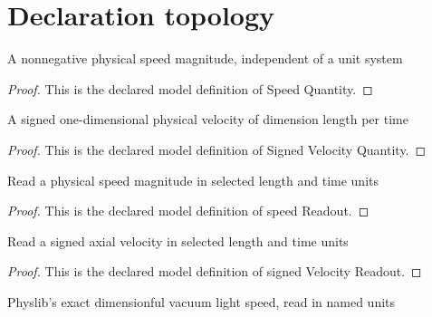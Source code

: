 \section{Declaration topology}
\begin{definition}
  \label{def:physics:phyx-mini-0589:phyxminiproblems-problemphyxmini0589-speedquantity}
  A nonnegative physical speed magnitude, independent of a unit system
\end{definition}
\begin{proof}
  This is the declared model definition of Speed Quantity.
\end{proof}
\begin{definition}
  \label{def:physics:phyx-mini-0589:phyxminiproblems-problemphyxmini0589-signedvelocityquantity}
  A signed one-dimensional physical velocity of dimension length per time
\end{definition}
\begin{proof}
  This is the declared model definition of Signed Velocity Quantity.
\end{proof}
\begin{definition}
  \label{def:physics:phyx-mini-0589:phyxminiproblems-problemphyxmini0589-speedreadout}
  Read a physical speed magnitude in selected length and time units
\end{definition}
\begin{proof}
  This is the declared model definition of speed Readout.
\end{proof}
\begin{definition}
  \label{def:physics:phyx-mini-0589:phyxminiproblems-problemphyxmini0589-signedvelocityreadout}
  Read a signed axial velocity in selected length and time units
\end{definition}
\begin{proof}
  This is the declared model definition of signed Velocity Readout.
\end{proof}
\begin{definition}
  \label{def:physics:phyx-mini-0589:phyxminiproblems-problemphyxmini0589-vacuumspeedoflightreadout}
  Physlib's exact dimensionful vacuum light speed, read in named units
\end{definition}
